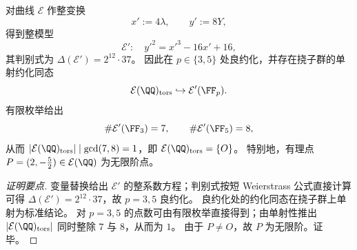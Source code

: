 \begin{conclusion}\label{con:xi-terminal-zm-elliptic-torsion-trivial}
对曲线 \(\mathcal{E}\) 作整变换
\[
x':=4\lambda,\qquad y':=8Y,
\]
得到整模型
\[
\mathcal{E}':\quad {y'}^{2}={x'}^{3}-16x'+16,
\]
其判别式为 \(\Delta(\mathcal{E}')=2^{12}\cdot 37\)。
因此在 \(p\in\{3,5\}\) 处良约化，并存在挠子群的单射约化同态
\[
\mathcal{E}(\QQ)_{\mathrm{tors}}\hookrightarrow \mathcal{E}'(\FF_p).
\]
有限枚举给出
\[
\#\mathcal{E}'(\FF_{3})=7,\qquad \#\mathcal{E}'(\FF_{5})=8,
\]
从而 \(|\mathcal{E}(\QQ)_{\mathrm{tors}}|\mid\gcd(7,8)=1\)，即 \(\mathcal{E}(\QQ)_{\mathrm{tors}}=\{O\}\)。
特别地，有理点 \(P=(2,-\tfrac52)\in\mathcal{E}(\QQ)\) 为无限阶点。
\end{conclusion}
\begin{proof}[证明要点]
变量替换给出 \(\mathcal{E}'\) 的整系数方程；判别式按短 Weierstrass 公式直接计算可得 \(\Delta(\mathcal{E}')=2^{12}\cdot37\)，故 \(p=3,5\) 良约化。
良约化处的约化同态在挠子群上单射为标准结论。
对 \(p=3,5\) 的点数可由有限枚举直接得到；由单射性推出 \(|\mathcal{E}(\QQ)_{\mathrm{tors}}|\) 同时整除 \(7\) 与 \(8\)，从而为 \(1\)。
由于 \(P\neq O\)，故 \(P\) 为无限阶。证毕。
\end{proof}

